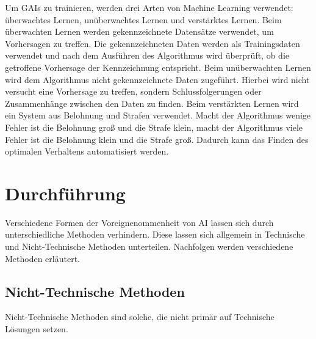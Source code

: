 \documentclass[12pt]{article}
\begin{document}
Um GAIs zu trainieren, werden drei Arten von Machine Learning verwendet: überwachtes Lernen, unüberwachtes Lernen und verstärktes Lernen. 
Beim überwachten Lernen werden gekennzeichnete Datensätze verwendet, um Vorhersagen zu treffen. Die gekennzeichneten Daten werden als Trainingsdaten verwendet und nach dem Ausführen des Algorithmus wird überprüft, ob die getroffene Vorhersage der Kennzeichnung entspricht.
Beim unüberwachten Lernen wird dem Algorithmus nicht gekennzeichnete Daten zugeführt. Hierbei wird nicht versucht eine Vorhersage zu treffen, sondern Schlussfolgerungen oder Zusammenhänge zwischen den Daten zu finden.
Beim verstärkten Lernen wird ein System aus Belohnung und Strafen verwendet. Macht der Algorithmus wenige Fehler ist die Belohnung groß und die Strafe klein, macht der Algorithmus viele Fehler ist die Belohnung klein und die Strafe groß. Dadurch kann das Finden des 
optimalen Verhaltens automatisiert werden.

\chapter{Durchführung}
Verschiedene Formen der Voreignenommenheit von AI lassen sich durch unterschiedliche Methoden verhindern. Diese lassen sich allgemein in 
Technische und Nicht-Technische Methoden unterteilen. Nachfolgen werden verschiedene Methoden erläutert.
\section{Nicht-Technische Methoden}
Nicht-Technische Methoden sind solche, die nicht primär auf Technische Lösungen setzen.
\end{document}
